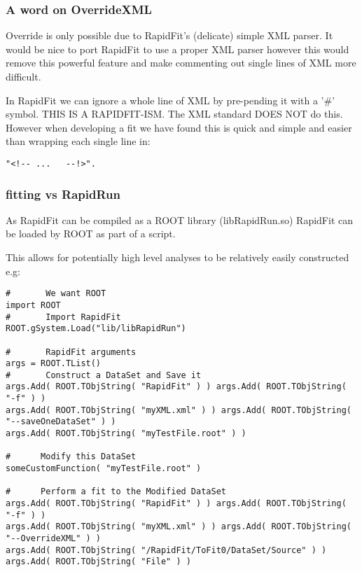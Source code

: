 \documentclass{beamer}
\begin{document}
\begin{frame}[fragile]
\frametitle{A word on OverrideXML}
\footnotesize
Override is only possible due to RapidFit's (delicate) simple XML parser.\newline
It would be nice to port RapidFit to use a proper XML parser however this would remove this powerful feature and make commenting out single lines of XML more difficult.\newline

In RapidFit we can ignore a whole line of XML by pre-pending it with a '\#' symbol. THIS IS A RAPIDFIT-ISM.\newline
The XML standard DOES NOT do this.\newline\newline
However when developing a fit we have found this is quick and simple and easier than wrapping each single line in:
\begin{lstlisting}
"<!-- ...   --!>".
\end{lstlisting}

\end{frame}

\begin{frame}[fragile]
\frametitle{fitting vs RapidRun}
\footnotesize
As RapidFit can be compiled as a ROOT library (libRapidRun.so) RapidFit can be loaded by ROOT as part of a script.\newline

This allows for potentially high level analyses to be relatively easily constructed e.g:
\tiny
\begin{lstlisting}
#       We want ROOT
import ROOT
#       Import RapidFit
ROOT.gSystem.Load("lib/libRapidRun")

#       RapidFit arguments
args = ROOT.TList()
#       Construct a DataSet and Save it
args.Add( ROOT.TObjString( "RapidFit" ) ) args.Add( ROOT.TObjString( "-f" ) )
args.Add( ROOT.TObjString( "myXML.xml" ) ) args.Add( ROOT.TObjString( "--saveOneDataSet" ) )
args.Add( ROOT.TObjString( "myTestFile.root" ) )

#      Modify this DataSet
someCustomFunction( "myTestFile.root" )

#      Perform a fit to the Modified DataSet
args.Add( ROOT.TObjString( "RapidFit" ) ) args.Add( ROOT.TObjString( "-f" ) )
args.Add( ROOT.TObjString( "myXML.xml" ) ) args.Add( ROOT.TObjString( "--OverrideXML" ) )
args.Add( ROOT.TObjString( "/RapidFit/ToFit0/DataSet/Source" ) ) args.Add( ROOT.TObjString( "File" ) )
\end{lstlisting}

\end{frame}
\end{document}
